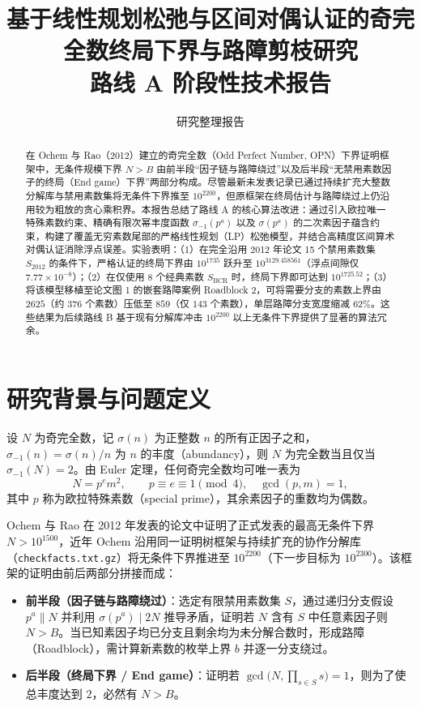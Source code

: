 \documentclass[11pt, a4paper]{article}
\title{\textbf{\color{accent}基于线性规划松弛与区间对偶认证的奇完全数终局下界与路障剪枝研究}\\[0.4em]
\large 路线 A 阶段性技术报告}
\author{研究整理报告}
\date{}
\begin{document}
\maketitle

\begin{abstract}
在 Ochem 与 Rao（2012）建立的奇完全数（Odd Perfect Number, OPN）下界证明框架中，无条件规模下界 $N > B$ 由前半段“因子链与路障绕过”以及后半段“无禁用素数因子的终局（End game）下界”两部分构成。尽管最新未发表记录已通过持续扩充大整数分解库与禁用素数集将无条件下界推至 $10^{2200}$，但原框架在终局估计与路障绕过上仍沿用较为粗放的贪心乘积界。本报告总结了路线 A 的核心算法改进：通过引入欧拉唯一特殊素数约束、精确有限次幂丰度函数 $\sigma_{-1}(p^a)$ 以及 $\sigma(p^a)$ 的二次素因子蕴含约束，构建了覆盖无穷素数尾部的严格线性规划（LP）松弛模型，并结合高精度区间算术对偶认证消除浮点误差。实验表明：（1）在完全沿用 2012 年论文 15 个禁用素数集 $S_{2012}$ 的条件下，严格认证的终局下界由 $10^{1735}$ 跃升至 $10^{3129.458561}$（浮点间隙仅 $7.77 \times 10^{-8}$）；（2）在仅使用 8 个经典素数 $S_{\mathrm{BCR}}$ 时，终局下界即可达到 $10^{1725.52}$；（3）将该模型移植至论文图 1 的嵌套路障案例 Roadblock 2，可将需要分支的素数上界由 $2625$（约 $376$ 个素数）压低至 $859$（仅 $143$ 个素数），单层路障分支宽度缩减 $62\%$。这些结果为后续路线 B 基于现有分解库冲击 $10^{2200}$ 以上无条件下界提供了显著的算法冗余。
\end{abstract}

\section{研究背景与问题定义}

设 $N$ 为奇完全数，记 $\sigma(n)$ 为正整数 $n$ 的所有正因子之和，$\sigma_{-1}(n) = \sigma(n)/n$ 为 $n$ 的丰度（abundancy），则 $N$ 为完全数当且仅当 $\sigma_{-1}(N) = 2$。由 Euler 定理，任何奇完全数均可唯一表为
\[
N = p^e m^2, \qquad p \equiv e \equiv 1 \pmod{4}, \quad \gcd(p, m) = 1,
\]
其中 $p$ 称为欧拉特殊素数（special prime），其余素因子的重数均为偶数。

Ochem 与 Rao 在 2012 年发表的论文中证明了正式发表的最高无条件下界 $N > 10^{1500}$，近年 Ochem 沿用同一证明树框架与持续扩充的协作分解库（\texttt{checkfacts.txt.gz}）将无条件下界推进至 $10^{2200}$（下一步目标为 $10^{2300}$）。该框架的证明由前后两部分拼接而成：
\begin{itemize}
    \item \textbf{前半段（因子链与路障绕过）}：选定有限禁用素数集 $S$，通过递归分支假设 $p^a \parallel N$ 并利用 $\sigma(p^a) \mid 2N$ 推导矛盾，证明若 $N$ 含有 $S$ 中任意素因子则 $N > B$。当已知素因子均已分支且剩余均为未分解合数时，形成路障（Roadblock），需计算新素数的枚举上界 $b$ 并逐一分支绕过。
    \item \textbf{后半段（终局下界 / End game）}：证明若 $\gcd\bigl(N, \prod_{s \in S} s\bigr) = 1$，则为了使总丰度达到 $2$，必然有 $N > B$。
\end{itemize}
\end{document}
